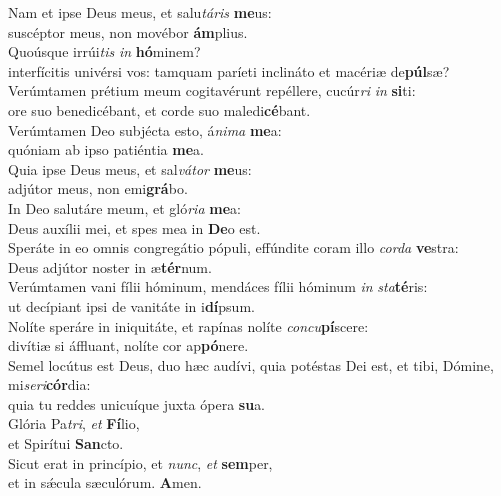 \evenverse Nam et ipse Deus meus, et salu\textit{tá}\textit{ris} \textbf{me}us:~\*\\
\evenverse suscéptor meus, non movébor \textbf{ám}plius.\\
\oddverse Quoúsque irrúi\textit{tis} \textit{in} \textbf{hó}minem?~\*\\
\oddverse interfícitis univérsi vos: tamquam paríeti inclináto et macériæ de\textbf{púl}sæ?\\
\evenverse Verúmtamen prétium meum cogitavérunt repéllere, cucúr\textit{ri} \textit{in} \textbf{si}ti:~\*\\
\evenverse ore suo benedicébant, et corde suo maledi\textbf{cé}bant.\\
\oddverse Verúmtamen Deo subjécta esto, á\textit{ni}\textit{ma} \textbf{me}a:~\*\\
\oddverse quóniam ab ipso patiéntia \textbf{me}a.\\
\evenverse Quia ipse Deus meus, et sal\textit{vá}\textit{tor} \textbf{me}us:~\*\\
\evenverse adjútor meus, non emi\textbf{grá}bo.\\
\oddverse In Deo salutáre meum, et gló\textit{ri}\textit{a} \textbf{me}a:~\*\\
\oddverse Deus auxílii mei, et spes mea in \textbf{De}o est.\\
\evenverse Speráte in eo omnis congregátio pópuli, effúndite coram illo \textit{cor}\textit{da} \textbf{ve}stra:~\*\\
\evenverse Deus adjútor noster in æ\textbf{tér}num.\\
\oddverse Verúmtamen vani fílii hóminum, mendáces fílii hóminum \textit{in} \textit{sta}\textbf{té}ris:~\*\\
\oddverse ut decípiant ipsi de vanitáte in i\textbf{dí}psum.\\
\evenverse Nolíte speráre in iniquitáte, et rapínas nolíte \textit{con}\textit{cu}\textbf{pí}scere:~\*\\
\evenverse divítiæ si áffluant, nolíte cor ap\textbf{pó}nere.\\
\oddverse Semel locútus est Deus, duo hæc audívi, quia potéstas Dei est, et tibi, Dómine, mi\textit{se}\textit{ri}\textbf{cór}dia:~\*\\
\oddverse quia tu reddes unicuíque juxta ópera \textbf{su}a.\\
\evenverse Glória Pa\textit{tri}, \textit{et} \textbf{Fí}lio,~\*\\
\evenverse et Spirítui \textbf{San}cto.\\
\oddverse Sicut erat in princípio, et \textit{nunc}, \textit{et} \textbf{sem}per,~\*\\
\oddverse et in sǽcula sæculórum. \textbf{A}men.\\
